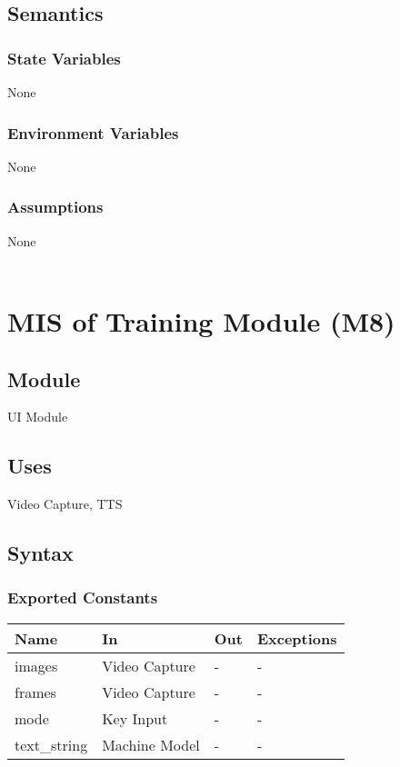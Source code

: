 \documentclass[12pt, titlepage]{article}
\begin{document}
\subsection{Semantics}

\subsubsection{State Variables}

None\\

\subsubsection{Environment Variables}

None\\

\subsubsection{Assumptions}

None\\

~\newpage

\section{MIS of Training Module (M8)} \label{M8}

\subsection{Module}

UI Module\\

\subsection{Uses}

Video Capture, TTS\\

\subsection{Syntax}

\subsubsection{Exported Constants}

\begin{center}
\begin{tabular}{p{5cm} p{3cm} p{3cm} p{4cm}}
\hline
\textbf{Name} & \textbf{In} & \textbf{Out} & \textbf{Exceptions} \\
\hline
images & Video Capture & - & - \\
\hline
frames & Video Capture & - & - \\
\hline
mode & Key Input & - & - \\
\hline
text\_string & Machine Model & - & - \\
\hline
\end{tabular}
\end{center}
\end{document}
